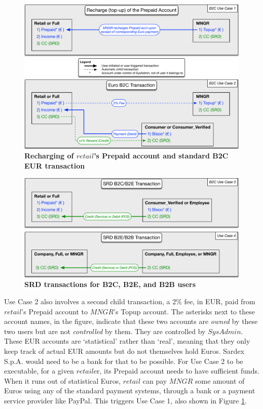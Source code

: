 \begin{figure}[htbp]
\centering
\includegraphics[width=15cm]{Figures/B2C1}
\caption{\small\textbf{Recharging of $retail$'s Prepaid account and standard B2C EUR transaction}}
\label{fig:B2C1}
\end{figure}

\begin{figure}[h]
\centering
\includegraphics[width=15cm]{Figures/B2C2}
\caption{\small\textbf{SRD transactions for B2C, B2E, and B2B users}}
\label{fig:B2C2}
\end{figure}

Use Case 2 also involves a second child transaction, a 2\% fee, in EUR, paid from $retail$'s Prepaid account to $MNGR$'s Topup account. The asterisks next to these account names, in the figure, indicate that these two accounts are \emph{owned} by these two users but are not \emph{controlled} by them. They are controlled by $SysAdmin$. These EUR accounts are `statistical' rather than `real', meaning that they only keep track of actual EUR amounts but do not themselves hold Euros. Sardex S.p.A. would need to be a bank for that to be possible. For Use Case 2 to be executable, for a given $retail$er, its Prepaid account needs to have sufficient funds. When it runs out of statistical Euros, $retail$ can pay $MNGR$ some amount of Euros using any of the standard payment systems, through a bank or a payment service provider like PayPal. This triggers Use Case 1, also shown in Figure \ref{fig:B2C1}.


